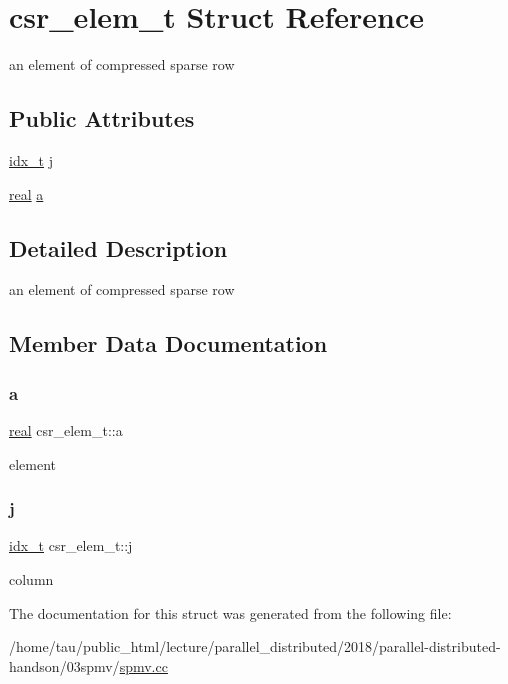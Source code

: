 \hypertarget{structcsr__elem__t}{}\section{csr\+\_\+elem\+\_\+t Struct Reference}
\label{structcsr__elem__t}


an element of compressed sparse row  


\subsection*{Public Attributes}
\begin{DoxyCompactItemize}
\item 
\hyperlink{spmv_8cc_a8e93478a00e685bea5e6a3f617bf03a3}{idx\+\_\+t} \hyperlink{structcsr__elem__t_a4525598ab26d6263b2242cc33511ca7f}{j}
\item 
\hyperlink{spmv_8cc_a11d147c64891830c9e79b3315b1b2e21}{real} \hyperlink{structcsr__elem__t_a55e480eefa495ee8b6e359a5f5a94a4f}{a}
\end{DoxyCompactItemize}


\subsection{Detailed Description}
an element of compressed sparse row 

\subsection{Member Data Documentation}
\mbox{\label{structcsr__elem__t_a55e480eefa495ee8b6e359a5f5a94a4f}} 
\subsubsection{\texorpdfstring{a}{a}}
{\footnotesize\ttfamily \hyperlink{spmv_8cc_a11d147c64891830c9e79b3315b1b2e21}{real} csr\+\_\+elem\+\_\+t\+::a}

element \mbox{\label{structcsr__elem__t_a4525598ab26d6263b2242cc33511ca7f}} 
\subsubsection{\texorpdfstring{j}{j}}
{\footnotesize\ttfamily \hyperlink{spmv_8cc_a8e93478a00e685bea5e6a3f617bf03a3}{idx\+\_\+t} csr\+\_\+elem\+\_\+t\+::j}

column 

The documentation for this struct was generated from the following file\+:\begin{DoxyCompactItemize}
\item 
/home/tau/public\+\_\+html/lecture/parallel\+\_\+distributed/2018/parallel-\/distributed-\/handson/03spmv/\hyperlink{spmv_8cc}{spmv.\+cc}\end{DoxyCompactItemize}
